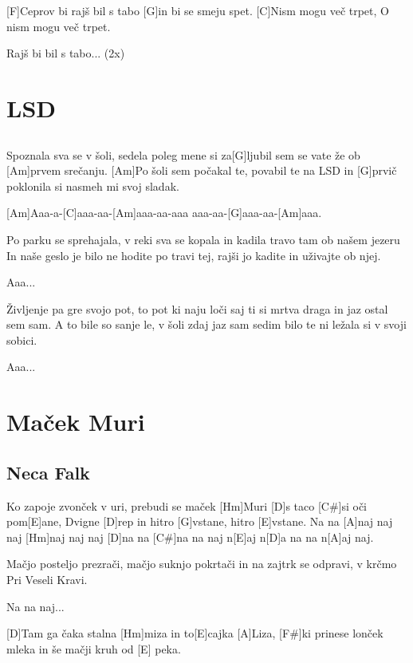 \documentclass[a4paper,12pt]{article}
\begin{document}
\begin{multicols}{2}
\begin{guitar}
                         
[F]Ceprov bi rajš bil s tabo 
[G]in bi se smeju spet.
[C]Nism mogu več trpet,
O nism mogu več trpet.


Rajš bi bil s tabo... (2x)

\end{guitar}
\section{LSD}
\subsection*{}
\begin{guitar}
[Am]Spoznala sva se v šoli, sedela poleg mene si
za[G]ljubil sem se vate že ob [Am]prvem srečanju.
[Am]Po šoli sem počakal te, povabil te na LSD
in [G]prvič poklonila si nasmeh mi svoj sladak.


[Am]Aaa-a-[C]aaa-aa-[Am]aaa-aa-aaa
aaa-aa-[G]aaa-aa-[Am]aaa.


Po parku se sprehajala, v reki sva se kopala
in kadila travo tam ob našem jezeru
In naše geslo je bilo ne hodite po travi tej, 
rajši jo kadite in uživajte ob njej.


Aaa...


Življenje pa gre svojo pot, to pot ki naju loči
saj ti si mrtva draga in jaz ostal sem sam.
A to bile so sanje le, v šoli zdaj jaz sam sedim
bilo te ni ležala si v svoji sobici.


Aaa...

\end{guitar}
\section{Maček Muri}
\subsection*{Neca Falk}
\begin{guitar}
[A]Ko zapoje zvonček v uri,
prebudi se maček [Hm]Muri
[D]s taco [C#]si oči pom[E]ane,
Dvigne [D]rep in hitro [G]vstane, hitro [E]vstane.
Na na [A]naj naj naj [Hm]naj naj naj
[D]na na [C#]na na naj n[E]aj  n[D]a na na n[A]aj naj.


Mačjo posteljo prezrači,
mačjo suknjo pokrtači
in na zajtrk se odpravi, 
v krčmo Pri Veseli Kravi.


Na na naj...


[D]Tam ga čaka stalna [Hm]miza in to[E]cajka [A]Liza,
[F#]ki prinese lonček mleka 
in še mačji kruh od [E] peka.


\end{guitar}
\end{multicols}
\end{document}
